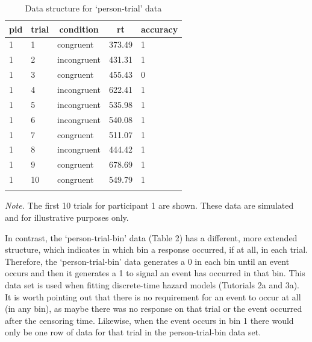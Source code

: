 \documentclass[
  english,
  man, donotrepeattitle,floatsintext]{apa6}
\begin{document}
\begin{table}[H]

\begin{center}
\begin{threeparttable}

\caption{\label{tab:ca-data-table}Data structure for `person-trial' data}

\begin{tabular}{lllll}
\toprule
pid & \multicolumn{1}{c}{trial} & \multicolumn{1}{c}{condition} & \multicolumn{1}{c}{rt} & \multicolumn{1}{c}{accuracy}\\
\midrule
1 & 1 & congruent & 373.49 & 1\\
1 & 2 & incongruent & 431.31 & 1\\
1 & 3 & congruent & 455.43 & 0\\
1 & 4 & incongruent & 622.41 & 1\\
1 & 5 & incongruent & 535.98 & 1\\
1 & 6 & incongruent & 540.08 & 1\\
1 & 7 & congruent & 511.07 & 1\\
1 & 8 & incongruent & 444.42 & 1\\
1 & 9 & congruent & 678.69 & 1\\
1 & 10 & congruent & 549.79 & 1\\
\bottomrule
\addlinespace
\end{tabular}

\begin{tablenotes}[para]
\normalsize{\textit{Note.} The first 10 trials for participant 1 are shown. These data are simulated and for illustrative purposes only.}
\end{tablenotes}

\end{threeparttable}
\end{center}

\end{table}

\renewcommand{\arraystretch}{1}

In contrast, the `person-trial-bin' data (Table 2) has a different, more extended structure, which indicates in which bin a response occurred, if at all, in each trial. Therefore, the `person-trial-bin' data generates a 0 in each bin until an event occurs and then it generates a 1 to signal an event has occurred in that bin. This data set is used when fitting discrete-time hazard models (Tutorials 2a and 3a). It is worth pointing out that there is no requirement for an event to occur at all (in any bin), as maybe there was no response on that trial or the event occurred after the censoring time. Likewise, when the event occurs in bin 1 there would only be one row of data for that trial in the person-trial-bin data set.
\end{document}
